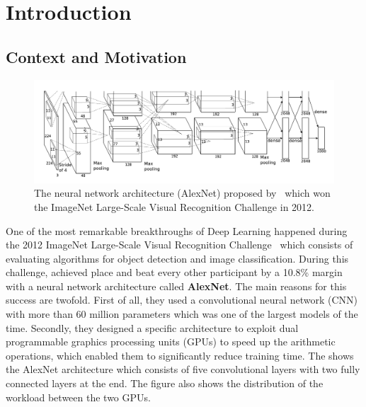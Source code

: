\chapter{Introduction}
\label{chapter:ch1-introduction}
\localtoc

\section{Context and Motivation}
\label{section:ch1-context_and_motivation}


\begin{figure}[t]
  \centering
  \includegraphics[scale=0.22]{figures/main/ch1-introduction/alexnet.png}
  \caption{The neural network architecture (AlexNet) proposed by~\citet{krizhevsky2012imagenet} which won the ImageNet Large-Scale Visual Recognition Challenge in 2012.}
  \label{figure:ch1-alexnet_network}
\end{figure}


One of the most remarkable breakthroughs of Deep Learning happened during the 2012 ImageNet Large-Scale Visual Recognition Challenge~\cite{ILSVRC15} which consists of evaluating algorithms for object detection and image classification.
During this challenge, \citet{krizhevsky2012imagenet} achieved  place and beat every other participant by a 10.8\% margin with a neural network architecture called \textbf{AlexNet}.
The main reasons for this success are twofold.
First of all, they used a convolutional neural network (CNN) with more than 60 million parameters which was one of the largest models of the time.
Secondly, they designed a specific architecture to exploit dual programmable graphics processing units (GPUs) to speed up the arithmetic operations, which enabled them to significantly reduce training time.
The  shows the AlexNet architecture which consists of five convolutional layers with two fully connected layers at the end.
The figure also shows the distribution of the workload between the two GPUs.

